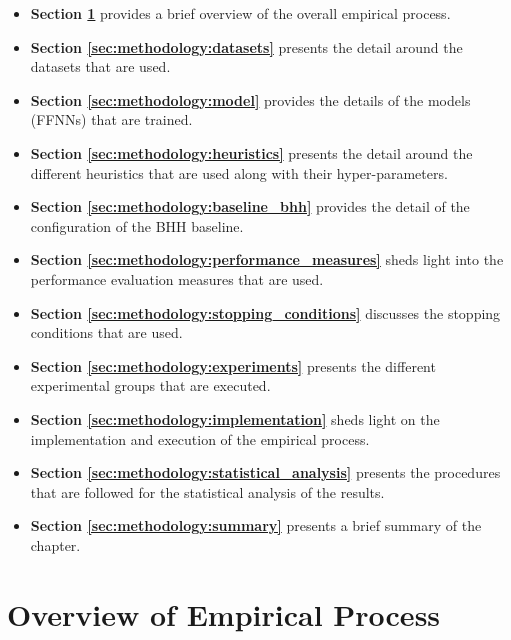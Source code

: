 \begin{itemize}
      \item \textbf{Section \ref{sec:methodology:overview}} provides a brief overview of the overall empirical process.

      \item \textbf{Section \ref{sec:methodology:datasets}} presents the detail around the datasets that are used.

      \item \textbf{Section \ref{sec:methodology:model}} provides the details of the models (\acs{FFNN}s) that are trained.

      \item \textbf{Section \ref{sec:methodology:heuristics}} presents the detail around the different heuristics that are used along with their hyper-parameters.

      \item \textbf{Section \ref{sec:methodology:baseline_bhh}} provides the detail of the configuration of the \acs{BHH} baseline.

      \item \textbf{Section \ref{sec:methodology:performance_measures}} sheds light into the performance evaluation measures that are used.

      \item \textbf{Section \ref{sec:methodology:stopping_conditions}} discusses the stopping conditions that are used.

      \item \textbf{Section \ref{sec:methodology:experiments}} presents the different experimental groups that are executed.

      \item \textbf{Section \ref{sec:methodology:implementation}} sheds light on the implementation and execution of the empirical process.

      \item \textbf{Section \ref{sec:methodology:statistical_analysis}} presents the procedures that are followed for the statistical analysis of the results.

      \item \textbf{Section \ref{sec:methodology:summary}} presents a brief summary of the chapter.
\end{itemize}

\section{Overview of Empirical Process}\label{sec:methodology:overview}

